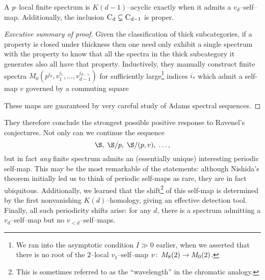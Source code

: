 \begin{theorem}\label{CdEqualsDd}
A \(p\)--local finite spectrum is \(K(d-1)\)--acyclic exactly when it admits a \(v_d\)--self--map.  Additionally, the inclusion \(\normalfont\textsc{C}_d \subsetneq \normalfont\textsc{C}_{d-1}\) is proper.
\end{theorem}
\begin{proof}[Executive summary of proof]
Given the classification of thick subcategories, if a property is closed under thickness then one need only exhibit a single spectrum with the property to know that all the spectra in the thick subcategory it generates also all have that property.  Inductively, they manually construct finite spectra \(M_0(p^{i_0}, v_1^{i_1}, \ldots, v_{d-1}^{i_{d-1}})\) for sufficiently large\footnote{We ran into the asymptotic condition \(I \gg 0\) earlier, when we asserted that there is no root of the \(2\)--local \(v_1\)--self--map \(v\colon\thinspace M_8(2) \to M_0(2)\).} indices \(i_*\) which admit a self-map \(v\) governed by a commuting square
\begin{center}
\end{center}
These maps are guaranteed by very careful study of Adams spectral sequences.
\end{proof}

They therefore conclude the strongest possible positive response to Ravenel's conjectures.  Not only can we continue the sequence \[\S, \; \S/p, \; \S/(p, v), \; \ldots,\] but in fact \emph{any} finite spectrum admits an (essentially unique) interesting periodic self-map.  This may be the most remarkable of the statements: although Nishida's theorem initially led us to think of periodic self-maps as rare, they are in fact ubiquitous.  Additionally, we learned that the shift\footnote{This is sometimes referred to as the ``wavelength'' in the chromatic analogy.} of this self-map is determined by the first nonvanishing \(K(d)\)--homology, giving an effective detection tool.  Finally, all such periodicity shifts arise: for any \(d\), there is a spectrum admitting a \(v_d\)--self--map but no \(v_{<d}\)--self--maps.








